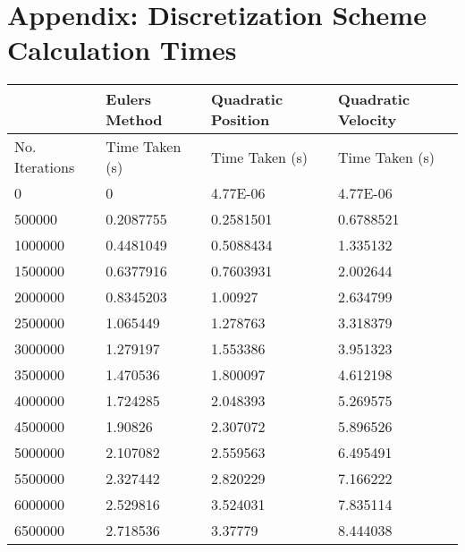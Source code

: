 \section{Appendix: Discretization Scheme Calculation Times}
\begin{table}[]
\centering

\begin{tabular}{ll|l|l|}
                                     & Eulers Method  & Quadratic Position & Quadratic Velocity \\ \hline
\multicolumn{1}{|l|}{No. Iterations} & Time Taken (s) & Time Taken (s)     & Time Taken (s)     \\ \hline
\multicolumn{1}{|l|}{0}              & 0              & 4.77E-06           & 4.77E-06           \\ \hline
\multicolumn{1}{|l|}{500000}         & 0.2087755      & 0.2581501          & 0.6788521          \\ \hline
\multicolumn{1}{|l|}{1000000}        & 0.4481049      & 0.5088434          & 1.335132           \\ \hline
\multicolumn{1}{|l|}{1500000}        & 0.6377916      & 0.7603931          & 2.002644           \\ \hline
\multicolumn{1}{|l|}{2000000}        & 0.8345203      & 1.00927            & 2.634799           \\ \hline
\multicolumn{1}{|l|}{2500000}        & 1.065449       & 1.278763           & 3.318379           \\ \hline
\multicolumn{1}{|l|}{3000000}        & 1.279197       & 1.553386           & 3.951323           \\ \hline
\multicolumn{1}{|l|}{3500000}        & 1.470536       & 1.800097           & 4.612198           \\ \hline
\multicolumn{1}{|l|}{4000000}        & 1.724285       & 2.048393           & 5.269575           \\ \hline
\multicolumn{1}{|l|}{4500000}        & 1.90826        & 2.307072           & 5.896526           \\ \hline
\multicolumn{1}{|l|}{5000000}        & 2.107082       & 2.559563           & 6.495491           \\ \hline
\multicolumn{1}{|l|}{5500000}        & 2.327442       & 2.820229           & 7.166222           \\ \hline
\multicolumn{1}{|l|}{6000000}        & 2.529816       & 3.524031           & 7.835114           \\ \hline
\multicolumn{1}{|l|}{6500000}        & 2.718536       & 3.37779            & 8.444038           \\ \hline

\end{tabular}
\end{table}
